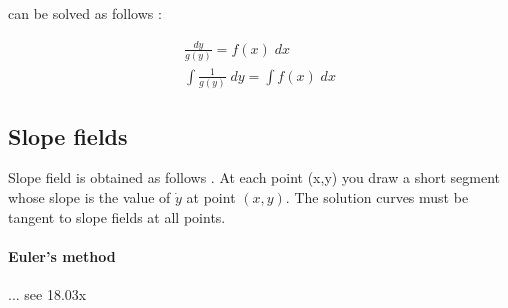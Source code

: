 can be solved as follows :  

\begin{gather}
    \frac{dy}{g(y)} = f(x) \; dx \\
    \int \frac{1}{g(y)} \; dy = \int f(x) \; dx
\end{gather}

\subsection{Slope fields}
Slope field is obtained as follows . At each point (x,y) you draw a short 
segment whose slope is the value of $\dot y$ at point $(x,y)$. The solution 
curves must be tangent to slope fields at all points. 

\paragraph{Euler's method} 
... see 18.03x
